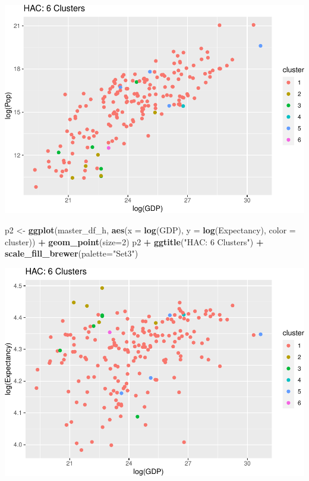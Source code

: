 \documentclass[]{article}
\newenvironment{Shaded}{\begin{snugshade}}{\end{snugshade}}
\newcommand{\DataTypeTok}[1]{\textcolor[rgb]{0.13,0.29,0.53}{#1}}
\newcommand{\DecValTok}[1]{\textcolor[rgb]{0.00,0.00,0.81}{#1}}
\newcommand{\KeywordTok}[1]{\textcolor[rgb]{0.13,0.29,0.53}{\textbf{#1}}}
\newcommand{\NormalTok}[1]{#1}
\newcommand{\OperatorTok}[1]{\textcolor[rgb]{0.81,0.36,0.00}{\textbf{#1}}}
\newcommand{\StringTok}[1]{\textcolor[rgb]{0.31,0.60,0.02}{#1}}
\begin{document}
\includegraphics{eda_files/figure-latex/unnamed-chunk-27-1.pdf}

\begin{Shaded}
\begin{Highlighting}[]
\NormalTok{p2 <-}\StringTok{ }\KeywordTok{ggplot}\NormalTok{(master_df_h, }\KeywordTok{aes}\NormalTok{(}\DataTypeTok{x =} \KeywordTok{log}\NormalTok{(GDP), }\DataTypeTok{y =} \KeywordTok{log}\NormalTok{(Expectancy), }\DataTypeTok{color =}\NormalTok{ cluster)) }\OperatorTok{+}
\StringTok{  }\KeywordTok{geom_point}\NormalTok{(}\DataTypeTok{size=}\DecValTok{2}\NormalTok{)}
\NormalTok{p2 }\OperatorTok{+}\StringTok{ }\KeywordTok{ggtitle}\NormalTok{(}\StringTok{"HAC: 6 Clusters"}\NormalTok{) }\OperatorTok{+}\StringTok{ }\KeywordTok{scale_fill_brewer}\NormalTok{(}\DataTypeTok{palette=}\StringTok{"Set3"}\NormalTok{)}
\end{Highlighting}
\end{Shaded}

\includegraphics{eda_files/figure-latex/unnamed-chunk-27-2.pdf}
\end{document}
